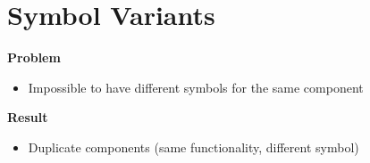 \section{Symbol Variants}

\begin{frame}{\secname}
  \textbf{Problem}
  \begin{itemize}
    \item Impossible to have different symbols for the same component
  \end{itemize}

  \pause

  \textbf{Result}
  \begin{itemize}
    \item Duplicate components (same functionality, different symbol)
  \end{itemize}
\end{frame}

